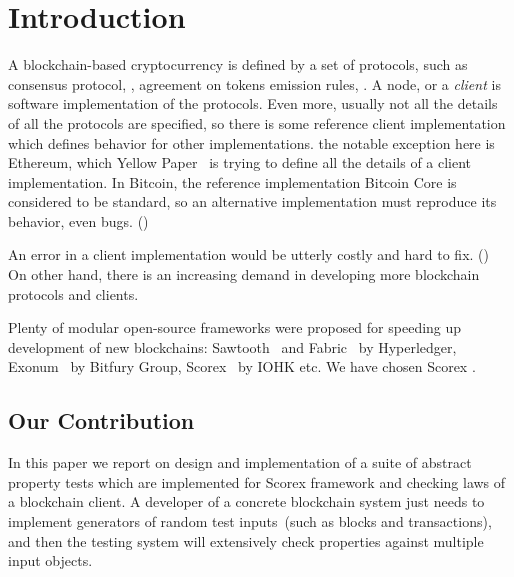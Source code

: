 
\section{Introduction}

A blockchain-based cryptocurrency is defined by a set of protocols, such as consensus protocol, , agreement on tokens emission rules, . A node, or a {\em client} is software implementation of the protocols. Even more, usually not all the details of all the protocols are specified, so there is some reference client implementation which defines behavior for other implementations. the notable exception here is Ethereum, which Yellow Paper~\cite{ethyp} is trying to define all the details of a client implementation. In Bitcoin, the reference implementation Bitcoin Core is considered to be standard, so an alternative implementation must reproduce its behavior, even bugs. ()

An error in a client implementation would be utterly costly and hard to fix. () On other hand, there is an increasing demand in developing more blockchain protocols and clients. 

Plenty of modular open-source frameworks were proposed for speeding up development of new blockchains: Sawtooth~\cite{sawtooth} and Fabric~\cite{fabric} by Hyperledger, Exonum~\cite{exonum} by Bitfury Group, Scorex~\cite{scorex} by IOHK etc. We have chosen Scorex .

\subsection{Our Contribution}

In this paper we report on design and implementation of a suite of abstract property tests which are implemented for Scorex framework and checking laws of a blockchain client. A developer of a concrete blockchain system just needs to implement generators of random test inputs~(such as blocks and transactions), and then the testing system will extensively check properties against multiple input objects.
